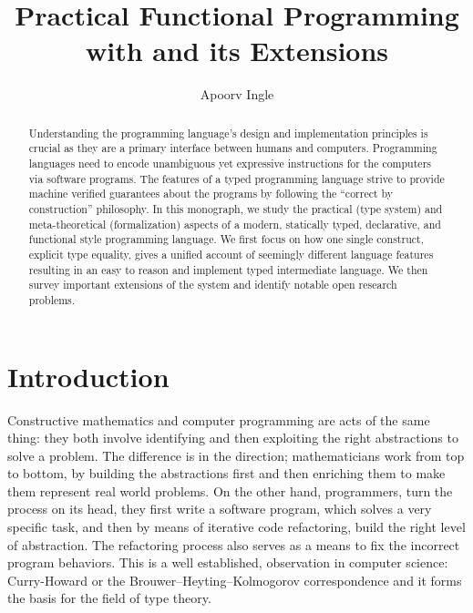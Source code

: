 \documentclass[screen,nonacm,manuscript,review]{acmart} %
\title{Practical Functional Programming with \SFC and its Extensions}
\author{Apoorv Ingle}
\affiliation{%
  \institution{University of Iowa} \department{Department of Computer Science} \streetaddress{McLean Hall} \city{Iowa City} \state{Iowa} \country{USA}}
\begin{document}
\begin{abstract}
  Understanding the programming language's design
  and implementation principles is crucial as
  they are a primary interface between humans
  and computers. Programming languages need to encode unambiguous yet
  expressive instructions for the computers via software programs. The
  features of a typed programming language strive to provide machine
  verified guarantees about the programs by following the  ``correct
  by construction'' philosophy. In this monograph, we study the practical
  (type system) and meta-theoretical (formalization) aspects of a
  modern, statically typed, declarative, and functional style
  programming language. We first focus on how one single construct,
  explicit type equality, gives a unified account of seemingly different
  language features resulting in an easy to reason
  and implement typed intermediate language. We then survey
  important extensions of the system and identify notable open
  research problems.
\end{abstract}

\maketitle
\section{Introduction}\label{sec:introduction}
Constructive mathematics and computer programming are acts of
the same thing: they both involve identifying and then exploiting the right
abstractions to solve a problem. The difference is in the direction;
mathematicians work from top to bottom, by building the abstractions
first and then enriching them to make them represent real world
problems. On the other hand, programmers, turn the process on its
head, they first write a software program, which solves a very specific
task, and then by means of iterative code refactoring, build the right
level of abstraction. The refactoring process also serves as a means
to fix the incorrect program behaviors. This is a well established,
observation in computer science: Curry-Howard or the
Brouwer–Heyting–Kolmogorov correspondence\cite{wadler_propositions_2015,han_deep_2023}
and it forms the basis for the field of type
theory\cite{barendregt_lambda_2013,hottbook_2013,nordstrom_programming_1990}.
\end{document}
